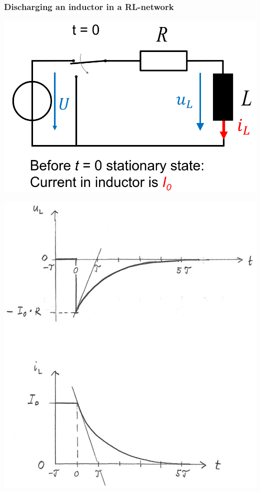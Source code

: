 \documentclass{article}
\begin{document}
\subsubsection{Discharging an inductor in a RL-network}
\begin{center}
    \includegraphics[width=.5\textwidth]{media/inductor_ex2.png}
\end{center}


\begin{center}
    \includegraphics[width=.45\textwidth]{media/inductor_ex2_graph.png}
\end{center}
\end{document}

